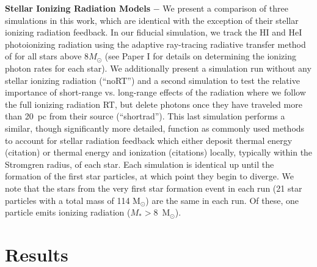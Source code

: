 \documentclass[twocolumn]{aastex62}
\begin{document}
\textbf{Stellar Ionizing Radiation Models} $-$ We present a comparison of three simulations in this work, which are identical with the exception of their stellar ionizing radiation feedback. In our fiducial simulation, we track the HI and HeI photoionizing radiation using the adaptive ray-tracing radiative transfer method of \citep{MORAY} for all stars above 8$M_{\odot}$ (see Paper I for details on determining the ionizing photon rates for each star). We additionally present a simulation run without any stellar ionizing radiation (``noRT'') and a second simulation to test the relative importance of short-range vs. long-range effects of the radiation where we follow the full ionizing radiation RT, but delete photons once they have traveled more than 20~pc from their source (``shortrad''). This last simulation performs a similar, though significantly more detailed, function as commonly used methods to account for stellar radiation feedback which either deposit thermal energy (citation) or thermal energy and ionization (citations) locally, typically within the Stromgren radius, of each star.  Each simulation is identical up until the formation of the first star particles, at which point they begin to diverge. We note that the stars from the very first star formation event in each run (21 star particles with a total mass of 114 M$_{\odot}$) are the same in each run. Of these, one particle emits ionizing radiation ($M_* > 8 $~M$_{\odot}$). 

\section{Results} \label{sec:results}
\end{document}
